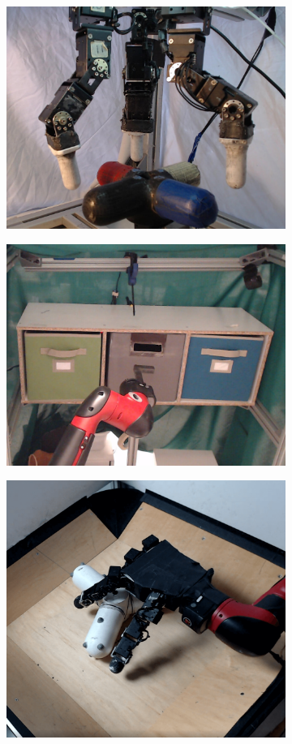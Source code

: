 \begin{figure}[t]
    \centering
    \begin{subfigure}[b]{0.32\textwidth}
        \includegraphics[height=0.6\textwidth]{awac/figures/robot/dclaw_new.jpg}
    \end{subfigure}
    \begin{subfigure}[b]{0.32\textwidth}
        \center
        \includegraphics[height=0.6\textwidth]{awac/figures/robot/drawer_img.jpeg}
    \end{subfigure}
    \begin{subfigure}[b]{0.32\textwidth}
        \center
        \includegraphics[height=0.6\textwidth]{awac/figures/robot/hand.png}

\end{subfigure}
\end{figure}
